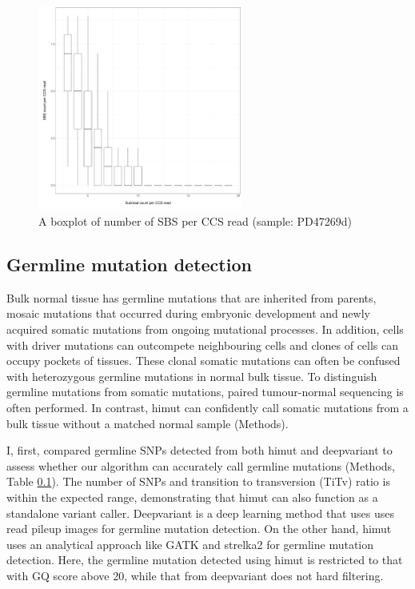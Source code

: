 \begin{figure}[htbp!]
\caption{A boxplot of number of SBS per CCS read (sample: PD47269d)}
\label{figure:sbs-count-per-ccs-read}
\begin{centering}
\includegraphics[width=0.6\textwidth]{Vector/sbs_count_per_ccs_read.pdf}
\end{centering}
\end{figure}

\subsection{Germline mutation detection}

Bulk normal tissue has germline mutations that are inherited from parents, mosaic mutations that occurred during embryonic development and newly acquired somatic mutations from ongoing mutational processes. In addition, cells with driver mutations can outcompete neighbouring cells and clones of cells can occupy pockets of tissues. These clonal somatic mutations can often be confused with heterozygous germline mutations in normal bulk tissue. To distinguish germline mutations from somatic mutations, paired tumour-normal sequencing is often performed. In contrast, himut can confidently call somatic mutations from a bulk tissue without a matched normal sample (Methods). 

I, first, compared germline SNPs detected from both himut and deepvariant to assess whether our algorithm can accurately call germline mutations (Methods, Table \ref{}). The number of SNPs and transition to transversion (TiTv) ratio is within the expected range, demonstrating that himut can also function as a standalone variant caller. Deepvariant is a deep learning method that uses uses read pileup images for germline mutation detection. On the other hand, himut uses an analytical approach like GATK and strelka2 \cite{Kim2018-qi, DePristo2011-vf}  for germline mutation detection. Here, the germline mutation detected using himut is restricted to that with GQ score above 20, while that from deepvariant does not hard filtering.


